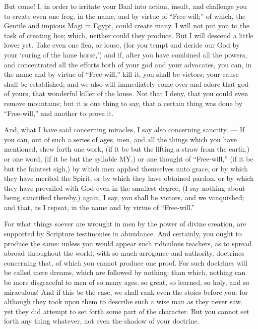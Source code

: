 But come! I, in order to irritate your Baal into action, insult, and challenge you to create even one frog, in the name, and by virtue of “Free-will;” of which, the Gentile and impious Magi in Egypt, could create many. I will not put you to the task of creating lice; which, neither could they produce. But I will descend a little lower yet. Take even one flea, or louse, (for you tempt and deride our God by your ‘curing of the lame horse,’) and if, after you have combined all the powers, and concentrated all the efforts both of your god and your advocates, you can, in the name and by virtue of “Free-will,” kill it, you shall be victors; your cause shall be established; and we also will immediately come over and adore that god of yours, that wonderful killer of the louse. Not that I deny, that you could even remove mountains; but it is one thing to say, that a certain thing was done by “Free-will,” and another to prove it.

And, what I have said concerning miracles, I say also concerning sanctity. — If you can, out of such a series of ages, men, and all the things which you have mentioned, shew forth one work, (if it be but the lifting a straw from the earth,) or one word, (if it be but the syllable \textsc{MY},) or one thought of “Free-will,” (if it be but the faintest sigh,) by which men applied themselves unto grace, or by which they have merited the Spirit, or by which they have obtained pardon, or by which they have prevailed with God even in the smallest degree, (I say nothing about being sanctified thereby,) again, I say, you shall be victors, and we vanquished; and that, as I repeat, in the name and by virtue of “Free-will.”

For what things soever are wrought in men by the power of divine creation, are supported by Scripture testimonies in abundance. And certainly, you ought to produce the same: unless you would appear such ridiculous teachers, as to spread abroad throughout the world, with so much arrogance and authority, doctrines concerning that, of which you cannot produce one proof. For such doctrines will be called mere dreams, which are followed by nothing: than which, nothing can be more disgraceful to men of so many ages, so great, so learned, so holy, and so miraculous! And if this be the case, we shall rank even the stoics before you: for although they took upon them to describe such a wise man as they never saw, yet they did attempt to set forth some part of the character. But you cannot set forth any thing whatever, not even the shadow of your doctrine.


